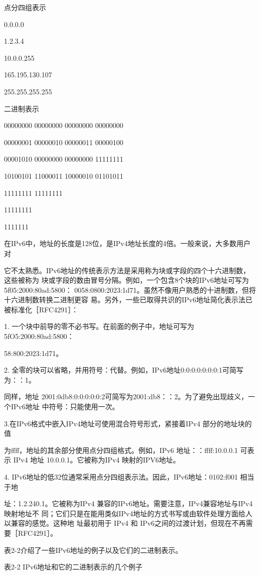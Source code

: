 点分四组表示

0.0.0.0

1.2.3.4

10.0.0.255

165.195.130.107

255.255.255.255

二进制表示

00000000 00000000 00000000 00000000

00000001 00000010 00000011 00000100

00001010 00000000 00000000 11111111

10100101 11000011 10000010 01101011

11111111 11111111

11111111

1111111

在IPv6中，地址的长度是128位，是IPv4地址长度的4倍。一般来说，大多数用户对

它不太熟悉。IPv6地址的传统表示方法是采用称为块或字段的四个十六进制数，这些被称为
块或字段的数由冒号分隔。例如，一个包含8个块的IPv6地址可写为 5f05:2000:80ad:5800：
0058:0800:2023:1d71。虽然不像用户熟悉的十进制数，但将十六进制数转换二进制更容
易。另外，一些已取得共识的IPv6地址简化表示法已被标准化［RFC4291］：

1. 一个块中前导的零不必书写。在前面的例子中，地址可写为5fO5:2000:80ad:5800：

58:800:2023:1d71。

2. 全零的块可以省略，并用符号：代替。例如，IPv6地址0:0:0:0:0:0:0:1可简写为：：1。

同样，地址 2001:0db8:0:0:0:0:0:2可简写为2001:db8：：2。为了避免出现歧义，一个IPv6地址
中符号：只能使用一次。

3.在IPv6格式中嵌入IPv4地址可使用混合符号形式，紧接着IPv4 部分的地址块的值

为ffff，地址的其余部分使用点分四组格式。例如，IPv6 地址：：ffff:10.0.0.1 可表示 IPv4 地址
10.0.0.1。它被称为IPv4 映射的IPV6地址。

4. IPv6地址的低32位通常采用点分四组表示法。因此，IPv6地址：0102:f001 相当于地

址：1.2.240.1。它被称为IPv4 兼容的IPv6地址。需要注意，IPv4兼容地址与IPv4 映射地址不
同；它们只是在能用类似IPv4地址的方式书写或由软件处理方面给人以兼容的感觉。这种地
址最初用于 IPv4 和 IPv6之间的过渡计划，但现在不再需要［RFC4291］。

表2-2介绍了一些IPv6地址的例子以及它们的二进制表示。

表2-2 IPv6地址和它的二进制表示的几个例子

